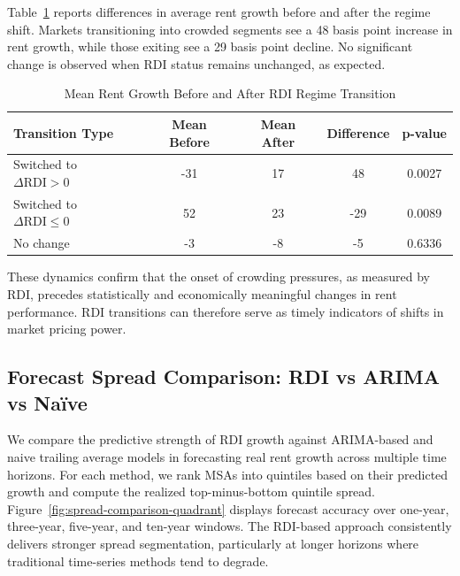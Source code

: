 \documentclass[APA,Times1COL]{WileyNJDv5} %
\begin{document}
Table~\ref{tab:event-means} reports differences in average rent growth before and after the regime shift. Markets transitioning into crowded segments see a 48 basis point increase in rent growth, while those exiting see a 29 basis point decline. No significant change is observed when RDI status remains unchanged, as expected.

\begin{table}[h]
	\centering
	\caption{Mean Rent Growth Before and After RDI Regime Transition}
	\label{tab:event-means}
	\begin{tabular}{lcccc} \toprule
		Transition Type & Mean Before & Mean After & Difference & p-value\\ \midrule
		Switched to $\Delta \text{RDI}>0$ & -31 & 17 & 48 & 0.0027\\
		Switched to $\Delta \text{RDI}\leq0$ & 52 & 23 & -29 & 0.0089\\
		No change & -3 & -8 & -5 & 0.6336\\
		\bottomrule
	\end{tabular}
\end{table}

These dynamics confirm that the onset of crowding pressures, as measured by RDI, precedes statistically and economically meaningful changes in rent performance. RDI transitions can therefore serve as timely indicators of shifts in market pricing power.


\subsection{Forecast Spread Comparison: RDI vs ARIMA vs Naïve}
We compare the predictive strength of RDI growth against ARIMA-based and naive trailing average models in forecasting real rent growth across multiple time horizons. For each method, we rank MSAs into quintiles based on their predicted growth and compute the realized top-minus-bottom quintile spread.
Figure~\ref{fig:spread-comparison-quadrant} displays forecast accuracy over one-year, three-year, five-year, and ten-year windows. The RDI-based approach consistently delivers stronger spread segmentation, particularly at longer horizons where traditional time-series methods tend to degrade.
\end{document}
